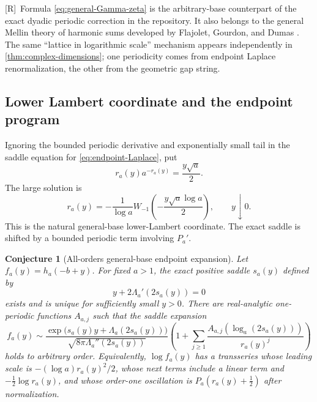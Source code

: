 \documentclass[11pt,oneside]{article}
\newtheorem{conjecture}[theorem]{Conjecture}
\theoremstyle{definition}
\theoremstyle{remark}
\newcommand{\Rmark}{\textcolor{sourceblue}{\textsf{[R]}}}
\begin{document}
\Rmark\ Formula \eqref{eq:general-Gamma-zeta} is the arbitrary-base counterpart of the exact
dyadic periodic correction in the repository.  It also belongs to the general Mellin theory
of harmonic sums developed by Flajolet, Gourdon, and Dumas \cite{flajolet1995}.  The same
``lattice in logarithmic scale'' mechanism appears independently in
\cref{thm:complex-dimensions}; one periodicity comes from endpoint Laplace renormalization,
the other from the geometric gap string.

\subsection{Lower Lambert coordinate and the endpoint program}

Ignoring the bounded periodic derivative and exponentially small tail in the saddle equation
for \eqref{eq:endpoint-Laplace}, put
\begin{equation}
 r_a(y)a^{-r_a(y)}=\frac{y\sqrt a}{2}.
 \label{eq:r-Lambert-equation}
\end{equation}
The large solution is
\begin{equation}
 r_a(y)=-\frac1{\log a}
 W_{-1}\!\left(-\frac{y\sqrt a\log a}{2}\right),
 \qquad y\downarrow0.
 \label{eq:r-Lambert}
\end{equation}
This is the natural general-base lower-Lambert coordinate.  The exact saddle is shifted by a
bounded periodic term involving $P_a'$.

\begin{conjecture}[All-orders general-base endpoint expansion]
\label{conj:endpoint-all-orders}
Let $f_a(y)=h_a(-b+y)$.  For fixed $a>1$, the exact positive saddle $s_a(y)$ defined by
\begin{equation}
 y+2\Lambda_a'(2s_a(y))=0
 \label{eq:exact-saddle}
\end{equation}
exists and is unique for sufficiently small $y>0$.  There are real-analytic one-periodic
functions $A_{a,j}$ such that the saddle expansion
\begin{equation}
 f_a(y)\sim
 \frac{\exp\!\bigl(s_a(y)y+\Lambda_a(2s_a(y))\bigr)}
      {\sqrt{8\pi\Lambda_a''(2s_a(y))}}
 \left(1+\sum_{j\ge1}\frac{A_{a,j}(\log_a(2s_a(y)))}{r_a(y)^j}\right)
 \label{eq:general-saddle-conjecture}
\end{equation}
holds to arbitrary order.  Equivalently, $\log f_a(y)$ has a transseries whose leading scale
is $-(\log a)r_a(y)^2/2$, whose next terms include a linear term and
$-\tfrac12\log r_a(y)$, and whose order-one oscillation is
$P_a(r_a(y)+\tfrac12)$ after normalization.
\end{conjecture}
\end{document}
